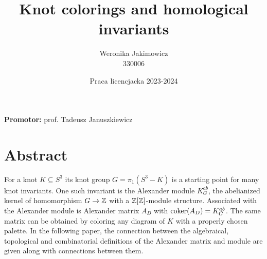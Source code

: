 \documentclass[14pt]{extarticle} %
\title{ {\bfseries Knot colorings and homological invariants}\\ \medskip {\normalsize(Kolorowania węzłów i niezmienniki homologiczne.)}}
\author{
  Weronika Jakimowicz\\
  330006
}
\date{\medskip Praca licencjacka 2023-2024}
\begin{document}
\maketitle
\bigskip

\begin{center}
  \large
  \textbf{Promotor:} prof. Tadeusz Januszkiewicz
\end{center}
\vspace{3cm}


\section*{\centering\normalsize Abstract}

{\small
For a knot $K\subseteq S^3$ its knot group $G=\pi_1(S^3-K)$ is a starting point for many knot invariants. One such invariant is the Alexander module $K_G^{ab}$, the abelianized kernel of homomorphism $G\to \operatorname{\mathbb{Z}}$ with a $\operatorname{\mathbb{Z}}[\operatorname{\mathbb{Z}}]$-module structure. Associated with the Alexander module is Alexander matrix $A_D$ with $\operatorname{coker}(A_D)= K_G^{ab}$. The same matrix can be obtained by coloring any diagram of $K$ with a properly chosen palette. In the following paper, the connection between the algebraical, topological and combinatorial definitions of the Alexander matrix and module are given along with connections between them.
%
}

\newpage




\newpage

\tableofcontents

\newpage


\end{document}
